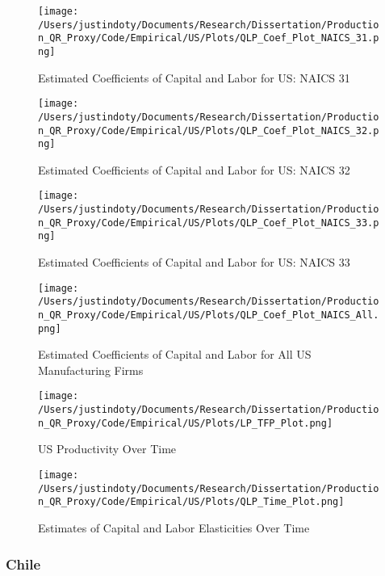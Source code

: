 \documentclass[11pt]{article}
\begin{document}
\begin{figure}[H]
\centering
\caption{Estimated Coefficients of Capital and Labor for US: NAICS 31}
\texttt{[image: /Users/justindoty/Documents/Research/Dissertation/Production\_QR\_Proxy/Code/Empirical/US/Plots/QLP\_Coef\_Plot\_NAICS\_31.png]}
\label{fig:LP31coef}
\end{figure}

\begin{figure}[H]
\centering
\caption{Estimated Coefficients of Capital and Labor for US: NAICS 32}
\texttt{[image: /Users/justindoty/Documents/Research/Dissertation/Production\_QR\_Proxy/Code/Empirical/US/Plots/QLP\_Coef\_Plot\_NAICS\_32.png]}
\label{fig:LP32coef}
\end{figure}

\begin{figure}[H]
\centering
\caption{Estimated Coefficients of Capital and Labor for US: NAICS 33}
\texttt{[image: /Users/justindoty/Documents/Research/Dissertation/Production\_QR\_Proxy/Code/Empirical/US/Plots/QLP\_Coef\_Plot\_NAICS\_33.png]}
\label{fig:LP33coef}
\end{figure}

\begin{figure}[H]
\centering
\caption{Estimated Coefficients of Capital and Labor for All US Manufacturing Firms}
\texttt{[image: /Users/justindoty/Documents/Research/Dissertation/Production\_QR\_Proxy/Code/Empirical/US/Plots/QLP\_Coef\_Plot\_NAICS\_All.png]}
\label{fig:LPUSallcoef}
\end{figure}

\begin{figure}[H]
\centering
\caption{US Productivity Over Time}
\texttt{[image: /Users/justindoty/Documents/Research/Dissertation/Production\_QR\_Proxy/Code/Empirical/US/Plots/LP\_TFP\_Plot.png]}
\label{fig:LPUSpgrowth}
\end{figure}

\begin{figure}[H]
\centering
\caption{Estimates of Capital and Labor Elasticities Over Time}
\texttt{[image: /Users/justindoty/Documents/Research/Dissertation/Production\_QR\_Proxy/Code/Empirical/US/Plots/QLP\_Time\_Plot.png]}
\label{fig:LPUStimecoef}
\end{figure}

\subsubsection{Chile}
\end{document}
